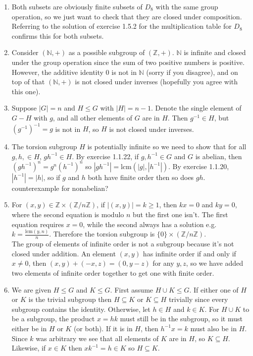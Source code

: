 \documentclass[]{article}
\newcommand{\abs}[1]{\left\vert #1 \right\vert}
\newcommand{\bbz}{\mathbb{Z}}
\newcommand{\bbn}{\mathbb{N}}
\begin{document}
\begin{enumerate}
\item Both subsets are obviously finite subsets of $D_8$ with the same group operation, so we just want to check that they are closed under composition. Referring to the solution of exercise 1.5.2 for the multiplication table for $D_8$ confirms this for both subsets.


\item Consider $(\bbn,+)$ as a possible subgroup of $(\bbz,+)$. $\bbn$ is infinite and closed under the group operation since the sum of two positive numbers is positive. However, the additive identity $0$ is not in $\bbn$ (sorry if you disagree), and on top of that $(\bbn,+)$ is not closed under inverses (hopefully you agree with this one).


\item Suppose $\abs{G} = n$ and $H \leq G$ with $\abs{H} = n-1$. Denote the single element of $G-H$ with $g$, and all other elements of $G$ are in $H$. Then $g^{-1} \in H$, but $\left( g^{-1} \right)^{-1} = g$ is not in $H$, so $H$ is not closed under inverses.


\item The torsion subgroup $H$ is potentially infinite so we need to show that for all $g,h,\in H$, $gh^{-1}\in H$. By exercise 1.1.22, if $g,h^{-1} \in G$ and $G$ is abelian, then $(gh^{-1})^n = g^n(h^{-1})^n$ so $\abs{gh^{-1}} = \text{lcm}(\abs{g},\abs{h^{-1}})$. By exercise 1.1.20, $\abs{h^{-1}} = \abs{h}$, so if $g$ and $h$ both have finite order then so does $gh$. {\color{red}counterexample for nonabelian?}


\item For $(x,y) \in \bbz \times (\bbz/n\bbz)$, if $\abs{(x,y)} = k \geq 1$, then $kx = 0$ and $ky = 0$, where the second equation is modulo $n$ but the first one isn't. The first equation requires $x = 0$, while the second always has a solution e.g. $k = \frac{\text{lcm}(y,n)}{n}$. Therefore the torsion subgroup is $\{0\} \times (\bbz/n\bbz)$. \\

The group of elements of infinite order is not a subgroup because it's not closed under addition. An element $(x,y)$ has infinite order if and only if $x\neq 0$, then $(x,y) + (-x,z) = (0,y-z)$ for any $y,z$, so we have added two elements of infinite order together to get one with finite order.


\item We are given $H\leq G$ and $K\leq G$. First assume $H\cup K \leq G$. If either one of $H$ or $K$ is the trivial subgroup then $H \subseteq K$ or $K\subseteq H$ trivially since every subgroup contains the identity. Otherwise, let $h \in H$ and $k \in K$. For $H\cup K$ to be a subgroup, the product $x = hk$ must still be in the subgroup, so it must either be in $H$ or $K$ (or both). If it is in $H$, then $h^{-1}x = k$ must also be in $H$. Since $k$ was arbitrary we see that all elements of $K$ are in $H$, so $K \subseteq H$. Likewise, if $x \in K$ then $xk^{-1} = h \in K$ so $H \subseteq K$. \\


\end{enumerate}
\end{document}
